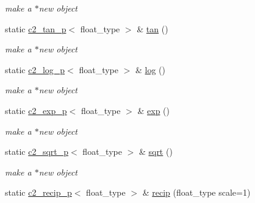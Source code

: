 \begin{DoxyCompactItemize}
\begin{DoxyCompactList}\small\item\em make a $\ast$new object \end{DoxyCompactList}\item 
\hypertarget{classc2__factory_a2f83cbd3be646166f7e3bef1e27244b9}{static \hyperlink{classc2__tan__p}{c2\-\_\-tan\-\_\-p}$<$ float\-\_\-type $>$ \& \hyperlink{classc2__factory_a2f83cbd3be646166f7e3bef1e27244b9}{tan} ()}\label{classc2__factory_a2f83cbd3be646166f7e3bef1e27244b9}

\begin{DoxyCompactList}\small\item\em make a $\ast$new object \end{DoxyCompactList}\item 
\hypertarget{classc2__factory_af20c7c4fee421c8ee0b51bac1c42302e}{static \hyperlink{classc2__log__p}{c2\-\_\-log\-\_\-p}$<$ float\-\_\-type $>$ \& \hyperlink{classc2__factory_af20c7c4fee421c8ee0b51bac1c42302e}{log} ()}\label{classc2__factory_af20c7c4fee421c8ee0b51bac1c42302e}

\begin{DoxyCompactList}\small\item\em make a $\ast$new object \end{DoxyCompactList}\item 
\hypertarget{classc2__factory_ad6c29a455b386c1971e6614f6962f3da}{static \hyperlink{classc2__exp__p}{c2\-\_\-exp\-\_\-p}$<$ float\-\_\-type $>$ \& \hyperlink{classc2__factory_ad6c29a455b386c1971e6614f6962f3da}{exp} ()}\label{classc2__factory_ad6c29a455b386c1971e6614f6962f3da}

\begin{DoxyCompactList}\small\item\em make a $\ast$new object \end{DoxyCompactList}\item 
\hypertarget{classc2__factory_a5b189f66ec65267f3812cdc45ccf072d}{static \hyperlink{classc2__sqrt__p}{c2\-\_\-sqrt\-\_\-p}$<$ float\-\_\-type $>$ \& \hyperlink{classc2__factory_a5b189f66ec65267f3812cdc45ccf072d}{sqrt} ()}\label{classc2__factory_a5b189f66ec65267f3812cdc45ccf072d}

\begin{DoxyCompactList}\small\item\em make a $\ast$new object \end{DoxyCompactList}\item 
\hypertarget{classc2__factory_adda01279d6b1059843e2aecc5be5d95e}{static \hyperlink{classc2__recip__p}{c2\-\_\-recip\-\_\-p}$<$ float\-\_\-type $>$ \& \hyperlink{classc2__factory_adda01279d6b1059843e2aecc5be5d95e}{recip} (float\-\_\-type scale=1)}\label{classc2__factory_adda01279d6b1059843e2aecc5be5d95e}


\end{DoxyCompactItemize}
